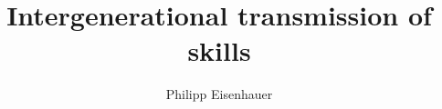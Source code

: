 

\title{Intergenerational transmission of skills}
\author{Philipp Eisenhauer}

\date{}

\let\otp\titlepage
